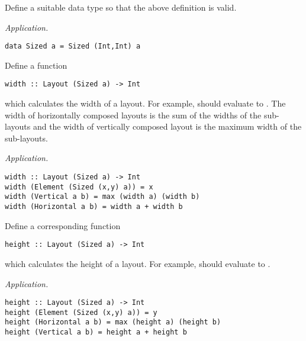 \begin{parts}
    \begin{subparts}
        \subpart[2] Define a suitable data type  so that the above definition is valid. \droppoints
        
        \begin{solution}
            \emph{Application.}
\begin{verbatim}
data Sized a = Sized (Int,Int) a
\end{verbatim}
        \end{solution}
    
        \subpart[4] Define a function 
        \vspace*{0.2cm}
        \begin{verbatim}
width :: Layout (Sized a) -> Int
        \end{verbatim}
        \vspace*{0.2cm}
        which calculates the width of a layout. For example,  should evaluate to . The width of horizontally composed layouts is the sum of the widths of the sub-layouts and the width of vertically composed layout is the maximum width of the sub-layouts. \droppoints
        
        \begin{solution}
            \emph{Application.} 
\begin{verbatim}
width :: Layout (Sized a) -> Int
width (Element (Sized (x,y) a)) = x 
width (Vertical a b) = max (width a) (width b)
width (Horizontal a b) = width a + width b
\end{verbatim}
        \end{solution}
    
        \subpart[4] Define a corresponding function
        \vspace*{0.2cm}
        \begin{verbatim}
height :: Layout (Sized a) -> Int
        \end{verbatim}
        \vspace*{0.2cm}
        which calculates the height of a layout. For example,  should evaluate to . \droppoints
        
        \begin{solution}
            \emph{Application.} 
\begin{verbatim}
height :: Layout (Sized a) -> Int
height (Element (Sized (x,y) a)) = y 
height (Horizontal a b) = max (height a) (height b)
height (Vertical a b) = height a + height b
\end{verbatim}
        \end{solution} 
    

\end{subparts}
\end{parts}
